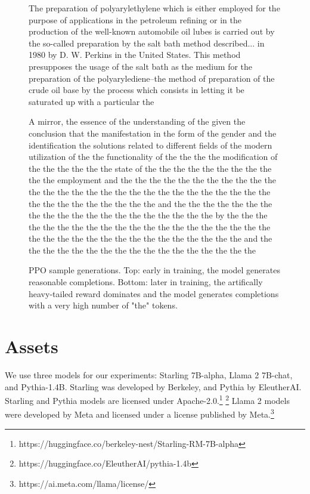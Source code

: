 \documentclass{article}
\begin{document}
\begin{figure}
    \centering
    \begin{framed}
        The preparation of polyarylethylene which is either employed for the purpose of applications in the petroleum refining or in the production of the well-known automobile oil lubes is carried out by the so-called preparation by the salt bath method described...
        in 1980 by D. W. Perkins in the United States. This method presupposes the usage of the salt bath as the medium for the preparation of the polyarylediene--the method of preparation of the crude oil base by the process which consists in letting it be saturated up with a particular the 
    \end{framed}
    \begin{framed}
        A mirror, the essence of the understanding of the given the conclusion that the manifestation in the form of the gender and the identification the solutions related to different fields of the modern utilization of the the functionality of the the the the modification of the the the the the the state of the the the the the the the the the the the employment and the the the the the the the the the the the the the the the the the the the the the the the the the the the the the the the the the the the the the and the the the the the the the the the the the the the the the the the the the the by the the the the the the the the the the the the the the the the the the the the the the the the the the the the the the the the the the the and the the the the the the the the the the the the the the the the the 
    \end{framed}
    \caption{PPO sample generations. Top: early in training, the model generates reasonable completions. Bottom: later in training, the artifically heavy-tailed reward dominates and the model generates completions with a very high number of "the" tokens.}
    \label{fig:ppo}
\end{figure}

\section{Assets}

We use three models for our experiments: Starling 7B-alpha, Llama 2 7B-chat, and Pythia-1.4B. Starling was developed by Berkeley, and Pythia by EleutherAI. Starling and Pythia models are licensed under Apache-2.0.\footnote{https://huggingface.co/berkeley-nest/Starling-RM-7B-alpha} \footnote{https://huggingface.co/EleutherAI/pythia-1.4b} Llama 2 models were developed by Meta and licensed under a license published by Meta.\footnote{https://ai.meta.com/llama/license/} 
\end{document}
